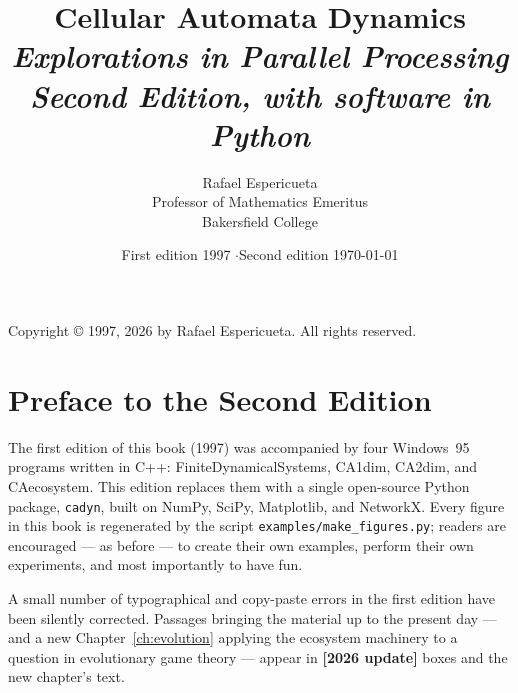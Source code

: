 \documentclass[11pt,oneside]{book}
\title{\Huge Cellular Automata Dynamics\\[1ex]
       \Large\itshape Explorations in Parallel Processing\\[3ex]
       \large Second Edition, with software in Python}
\author{Rafael Espericueta\\[0.5ex]
        Professor of Mathematics Emeritus\\
        Bakersfield College}
\date{First edition 1997 \quad$\cdot$\quad Second edition \today}
\begin{document}
\frontmatter
\maketitle

\noindent Copyright \copyright{} 1997, 2026 by Rafael Espericueta.
All rights reserved.
\vfill

\chapter*{Preface to the Second Edition}
The first edition of this book (1997) was accompanied by four Windows~95
programs written in C++: \textsf{FiniteDynamicalSystems},
\textsf{CA1dim}, \textsf{CA2dim}, and \textsf{CAecosystem}.  This
edition replaces them with a single open-source Python package,
\texttt{cadyn}, built on NumPy, SciPy, Matplotlib, and NetworkX.  Every
figure in this book is regenerated by the script
\texttt{examples/make\_figures.py}; readers are encouraged --- as
before --- to create their own examples, perform their own experiments,
and most importantly to have fun.

A small number of typographical and copy-paste errors in the first
edition have been silently corrected.  Passages bringing the material up
to the present day --- and a new Chapter~\ref{ch:evolution} applying the
ecosystem machinery to a question in evolutionary game theory --- appear
in \textbf{[2026 update]} boxes and the new chapter's text.


\tableofcontents

\mainmatter








\appendix


\backmatter

\end{document}
